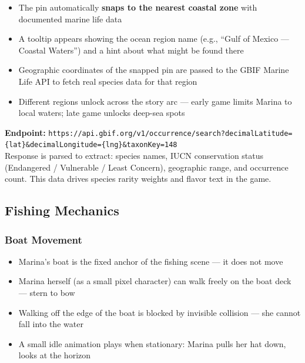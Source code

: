 \documentclass[11pt, letterpaper]{article}
\begin{document}
\begin{itemize}
  \item The pin automatically \textbf{snaps to the nearest coastal zone} with documented marine life data
  \item A tooltip appears showing the ocean region name (e.g., ``Gulf of Mexico --- Coastal Waters'') and a hint about what might be found there
  \item Geographic coordinates of the snapped pin are passed to the GBIF Marine Life API to fetch real species data for that region
  \item Different regions unlock across the story arc --- early game limits Marina to local waters; late game unlocks deep-sea spots
\end{itemize}

\begin{purplebox}
\textbf{Endpoint:} \texttt{https://api.gbif.org/v1/occurrence/search?decimalLatitude=\{lat\}\&decimalLongitude=\{lng\}\&taxonKey=148}\\[4pt]
Response is parsed to extract: species names, IUCN conservation status (Endangered / Vulnerable / Least Concern), geographic range, and occurrence count. This data drives species rarity weights and flavor text in the game.
\end{purplebox}

\subsection{Fishing Mechanics}

\subsubsection{Boat Movement}
\begin{itemize}
  \item Marina's boat is the fixed anchor of the fishing scene --- it does not move
  \item Marina herself (as a small pixel character) can walk freely on the boat deck --- stern to bow
  \item Walking off the edge of the boat is blocked by invisible collision --- she cannot fall into the water
  \item A small idle animation plays when stationary: Marina pulls her hat down, looks at the horizon
\end{itemize}
\end{document}
